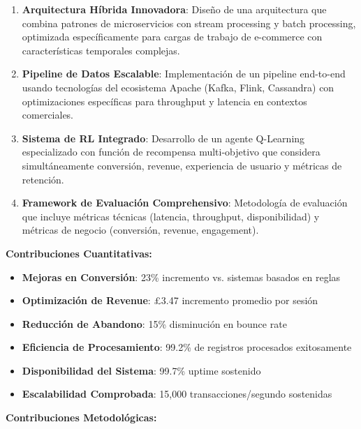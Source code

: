 \documentclass[conference,10pt,letterpaper]{IEEEtran}
\begin{document}
\begin{enumerate}[leftmargin=*, itemsep=0.1cm]
\item \textbf{Arquitectura Híbrida Innovadora}: Diseño de una arquitectura que combina patrones de microservicios con stream processing y batch processing, optimizada específicamente para cargas de trabajo de e-commerce con características temporales complejas.

\item \textbf{Pipeline de Datos Escalable}: Implementación de un pipeline end-to-end usando tecnologías del ecosistema Apache (Kafka, Flink, Cassandra) con optimizaciones específicas para throughput y latencia en contextos comerciales.

\item \textbf{Sistema de RL Integrado}: Desarrollo de un agente Q-Learning especializado con función de recompensa multi-objetivo que considera simultáneamente conversión, revenue, experiencia de usuario y métricas de retención.

\item \textbf{Framework de Evaluación Comprehensivo}: Metodología de evaluación que incluye métricas técnicas (latencia, throughput, disponibilidad) y métricas de negocio (conversión, revenue, engagement).
\end{enumerate}

\vspace{0.2cm}

\textbf{Contribuciones Cuantitativas:}

\begin{itemize}[leftmargin=*, itemsep=0.1cm]
\item \textbf{Mejoras en Conversión}: 23\% incremento vs. sistemas basados en reglas
\item \textbf{Optimización de Revenue}: £3.47 incremento promedio por sesión
\item \textbf{Reducción de Abandono}: 15\% disminución en bounce rate
\item \textbf{Eficiencia de Procesamiento}: 99.2\% de registros procesados exitosamente
\item \textbf{Disponibilidad del Sistema}: 99.7\% uptime sostenido
\item \textbf{Escalabilidad Comprobada}: 15,000 transacciones/segundo sostenidas
\end{itemize}

\vspace{0.2cm}

\textbf{Contribuciones Metodológicas:}
\end{document}
